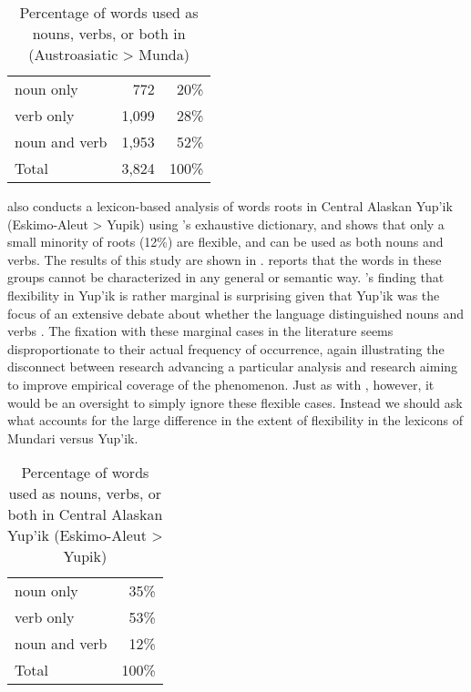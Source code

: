 \begin{table}[h]
  \centering
  \caption[Percentage of words used as nouns, verbs, or both in Mundari (Austroasiatic > Munda)]{Percentage of words used as nouns, verbs, or both in  (Austroasiatic > Munda) \parencite[383]{EvansOsada2005}}
  \label{tab:Evans-Osada-2005}
  \begin{tabular}{ l r r }
    \toprule
    noun only     &   772 &  20\% \\
    verb only     & 1,099 &  28\% \\
    noun and verb & 1,953 &  52\% \\
    \midrule
    Total         & 3,824 & 100\% \\
    \bottomrule
  \end{tabular}
\end{table}

\textcite[163]{Mithun2017} also conducts a lexicon-based analysis of words roots in Central Alaskan Yup'ik (Eskimo-Aleut > Yupik) using \citeauthor{Jacobson2012}'s \parencite*{Jacobson2012} exhaustive dictionary, and shows that only a small minority of roots (12\%) are flexible, and can be used as both nouns and verbs. The results of this study are shown in . \citeauthor{Mithun2017} reports that the words in these groups cannot be characterized in any general or semantic way. \citeauthor{Mithun2017}'s finding that flexibility in Yup'ik is rather marginal is surprising given that Yup'ik was the focus of an extensive debate about whether the language distinguished nouns and verbs \parencite{Sadock1999}. The fixation with these marginal cases in the literature seems disproportionate to their actual frequency of occurrence, again illustrating the disconnect between research advancing a particular analysis and research aiming to improve empirical coverage of the phenomenon. Just as with , however, it would be an oversight to simply ignore these flexible cases. Instead we should ask what accounts for the large difference in the extent of flexibility in the lexicons of Mundari versus Yup'ik.

\begin{table}[h]
  \centering
  \caption[Percentage of words used as nouns, verbs, or both in Central Alaskan Yup'ik (Eskimo-Aleut > Yupik)]{Percentage of words used as nouns, verbs, or both in Central Alaskan Yup'ik (Eskimo-Aleut > Yupik) \parencite[163]{Mithun2017}}
  \label{tab:Mithun-2017}
  \begin{tabular}{ l r }
    \toprule
    noun only     &  35\% \\
    verb only     &  53\% \\
    noun and verb &  12\% \\
    \midrule
    Total         & 100\% \\
    \bottomrule
  \end{tabular}
\end{table}

